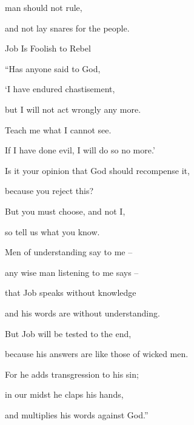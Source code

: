 {man
should not rule,
\par }{\Q and not lay snares
for the people.
\par }{\SH Job Is Foolish to Rebel
\par }{\Q {}“Has anyone said
to
God,
\par }{\Q ‘I have endured chastisement,
\par }{\Q but I will not
act wrongly any more.
\par }{\Q {}Teach
me what
I cannot
see.
\par }{\Q If
I have done
evil,
I will do so no
more.’
\par }{\Q {}Is it
your opinion
that
God should recompense
it,
\par }{\Q because
you reject
this?

\par }{\Q But you
must choose,
and not
I,
\par }{\Q so tell
us what
you know.
\par }{\Q {}Men
of understanding
say to me –
\par }{\Q any wise man listening to me says –
\par }{\Q {}that Job
speaks
without
knowledge
\par }{\Q and his words
are without
understanding.
\par }{\Q {}But Job
will be tested
to
the end,
\par }{\Q because
his answers
are like those of wicked
men.
\par }{\Q {}For
he adds
transgression
to his sin;
\par }{\Q in our midst he claps
his hands,

\par }{\Q and multiplies
his words
against God.”


\par }
